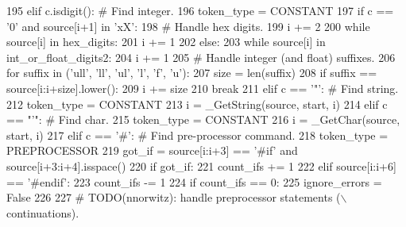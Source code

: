 \begin{DoxyCode}
{195         \textcolor{keywordflow}{elif} c.isdigit():                        \textcolor{comment}{# Find integer.}
196             token\_type = CONSTANT
197             \textcolor{keywordflow}{if} c == \textcolor{stringliteral}{'0'} \textcolor{keywordflow}{and} source[i+1] \textcolor{keywordflow}{in} \textcolor{stringliteral}{'xX'}:
198                 \textcolor{comment}{# Handle hex digits.}
199                 i += 2
200                 \textcolor{keywordflow}{while} source[i] \textcolor{keywordflow}{in} hex\_digits:
201                     i += 1
202             \textcolor{keywordflow}{else}:
203                 \textcolor{keywordflow}{while} source[i] \textcolor{keywordflow}{in} int\_or\_float\_digits2:
204                     i += 1
205             \textcolor{comment}{# Handle integer (and float) suffixes.}
206             \textcolor{keywordflow}{for} suffix \textcolor{keywordflow}{in} (\textcolor{stringliteral}{'ull'}, \textcolor{stringliteral}{'ll'}, \textcolor{stringliteral}{'ul'}, \textcolor{stringliteral}{'l'}, \textcolor{stringliteral}{'f'}, \textcolor{stringliteral}{'u'):}
207 \textcolor{stringliteral}{                size = len(suffix)}
208 \textcolor{stringliteral}{                }\textcolor{keywordflow}{if} suffix == source[i:i+size].lower():
209                     i += size
210                     \textcolor{keywordflow}{break}
211         \textcolor{keywordflow}{elif} c == \textcolor{stringliteral}{'"'}:                           \textcolor{comment}{# Find string.}
212             token\_type = CONSTANT
213             i = \_GetString(source, start, i)
214         \textcolor{keywordflow}{elif} c == \textcolor{stringliteral}{"'"}:                           \textcolor{comment}{# Find char.}
215             token\_type = CONSTANT
216             i = \_GetChar(source, start, i)
217         \textcolor{keywordflow}{elif} c == \textcolor{stringliteral}{'#'}:                           \textcolor{comment}{# Find pre-processor command.}
218             token\_type = PREPROCESSOR
219             got\_if = source[i:i+3] == \textcolor{stringliteral}{'#if'} \textcolor{keywordflow}{and} source[i+3:i+4].isspace()
220             \textcolor{keywordflow}{if} got\_if:
221                 count\_ifs += 1
222             \textcolor{keywordflow}{elif} source[i:i+6] == \textcolor{stringliteral}{'#endif'}:
223                 count\_ifs -= 1
224                 \textcolor{keywordflow}{if} count\_ifs == 0:
225                     ignore\_errors = \textcolor{keyword}{False}
226 
227             \textcolor{comment}{# TODO(nnorwitz): handle preprocessor statements (\(\backslash\) continuations).}
}
\end{DoxyCode}
